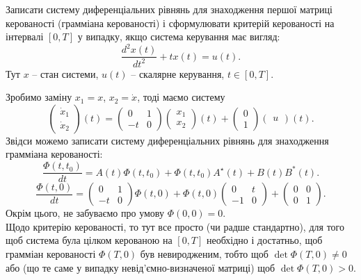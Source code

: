 \begin{solution}
\end{solution}

\begin{problem}
    Записати систему диференціальних рівнянь для знаходження першої матриці керованості (грамміана керованості) і сформулювати критерій керованості на інтервалі $[0, T]$ у випадку, якщо система керування має вигляд:
    \[ \dfrac{d^2x(t)}{dt^2} + tx(t) = u(t). \]
    Тут $x$ -- стан системи, $u(t)$ -- скалярне керування, $t \in [0, T]$.
\end{problem}

\begin{solution}
    Зробимо заміну $x_1 = x$, $x_2 = \dot x$, тоді маємо систему \[ \begin{pmatrix} \dot x_1 \\ \dot x_2 \end{pmatrix} (t) = \begin{pmatrix} 0 & 1 \\ -t & 0 \end{pmatrix} \begin{pmatrix} x_1 \\ x_2 \end{pmatrix} (t) + \begin{pmatrix} 0 \\ 1 \end{pmatrix} \begin{pmatrix} u \end{pmatrix} (t). \]
    Звідси можемо записати систему диференціальних рівнянь для знаходження грамміана керованості:
    \[ \dfrac{\Phi(t, t_0)}{dt} = A(t) \Phi(t, t_0) + \Phi(t, t_0) A^\star(t) + B(t) B^*(t). \]
    \[ \dfrac{\Phi(t, 0)}{dt} = \begin{pmatrix} 0 & 1 \\ -t & 0 \end{pmatrix} \Phi(t, 0) + \Phi(t, 0) \begin{pmatrix} 0 & t \\ -1 & 0 \end{pmatrix} + \begin{pmatrix} 0 & 0 \\ 0 & 1 \end{pmatrix}. \]
    Окрім цього, не забуваємо про умову $\Phi(0, 0) = 0$.\\
    
    Щодо критерію керованості, то тут все просто (чи радше стандартно), для того щоб система була цілком керованою на $[0, T]$ необхідно і достатньо, щоб грамміан керованості $\Phi(T, 0)$ був невиродженим, тобто щоб $\det \Phi(T, 0) \ne 0$ або (що те саме у випадку невід'ємно-визначеної матриці) щоб $\det \Phi(T, 0) > 0$.
\end{solution}

